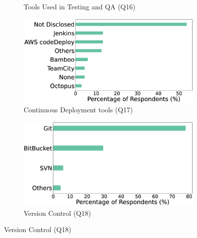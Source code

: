 \begin{figure}[t]
\begin{subfigure}{0.45\textwidth}
        \caption{Tools Used in Testing and QA (Q16)}
        \label{fig:testingTools}
    \end{subfigure}
    \begin{subfigure}{0.45\textwidth}
        \includegraphics[scale=0.1]{Figures/Respondents_deployment_tools}
        \caption{Continuous Deployment tools (Q17)}
        \label{fig:deployTools}
    \end{subfigure}
    \begin{subfigure}{0.5\textwidth}
        \includegraphics[scale=0.1]{Figures/Respondents_version_control}
        \caption{Version Control (Q18)}
        \label{fig:versionControl}
    \end{subfigure}
\end{figure}

